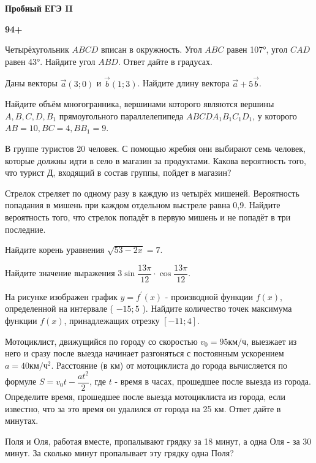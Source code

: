 \centerline{\bf \Huge Пробный ЕГЭ II}
\centerline{\bf \Huge }

\begin{flushright}
        \scriptsize{\textbf{94+}}
\end{flushright}

 Четырёхугольник $ABCD$ вписан в окружность. Угол $ABC$ равен 107°, угол $CAD$ равен 43°. Найдите угол $ABD$. Ответ дайте в градусах.

 Даны векторы $\vec{a}(3;0)$ и $\vec{b}(1;3)$. Найдите длину вектора $\vec{a} +5 \vec{b}$.

 Найдите объём многогранника, вершинами которого являются вершины $A, B, C, D, B_1$ прямоугольного параллелепипеда $ABCDA_1B_1C_1D_1$, у которого $AB=10, BC=4, BB_1=9$.

 В группе туристов 20 человек. С помощью жребия они выбирают семь человек, которые должны идти в село в магазин за продуктами. Какова вероятность того, что турист Д, входящий в состав группы, пойдет в магазин?

 Стрелок стреляет по одному разу в каждую из четырёх мишеней. Вероятность попадания в мишень при каждом отдельном выстреле равна 0,9. Найдите вероятность того, что стрелок попадёт в первую мишень и не попадёт в три последние.

 Найдите корень уравнения $\sqrt{53-2x}=7$.


 Найдите значение выражения $3\sin \dfrac{13 \pi}{12} \cdot \cos \dfrac{13 \pi}{12}$.

 На рисунке изображен график $y=f^{\prime}(x)$ - производной функции $f(x)$, определенной на интервале ( $-15 ; 5$ ). Найдите количество точек максимума функции $f(x)$, принадлежащих отрезку $[-11 ;4]$.

 Мотоциклист, движущийся по городу со скоростью $v_0=95 \mathrm{км} / \mathrm{ч}$, выезжает из него и сразу после выезда начинает разгоняться с постоянным ускорением $a=40 \mathrm{км} / \mathrm{ч}^2$. Расстояние (в км) от мотоциклиста до города вычисляется по формуле $S=v_0 t-\dfrac{a t^2}{2}$, где $t$ - время в часах, прошедшее после выезда из города. Определите время, прошедшее после выезда мотоциклиста из города, если известно, что за это время он удалился от города на 25 км. Ответ дайте в минутах.


 Поля и Оля, работая вместе, пропалывают грядку за 18 минут, а одна Оля - за 30 минут. За сколько минут пропалывает эту грядку одна Поля?


